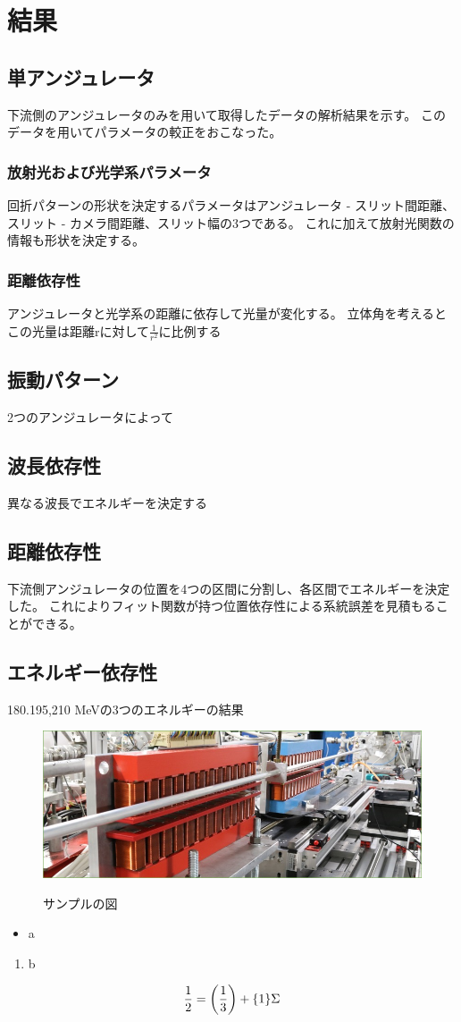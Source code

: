 \documentclass[a4paper,11pt,uplatex]{jsarticle}
\begin{document}
\section{結果}
\subsection{単アンジュレータ}
下流側のアンジュレータのみを用いて取得したデータの解析結果を示す。
このデータを用いてパラメータの較正をおこなった。
\subsubsection{放射光および光学系パラメータ}
回折パターンの形状を決定するパラメータはアンジュレータ - スリット間距離、スリット - カメラ間距離、スリット幅の3つである。
これに加えて放射光関数の情報も形状を決定する。
\subsubsection{距離依存性}
アンジュレータと光学系の距離に依存して光量が変化する。
立体角を考えるとこの光量は距離rに対して$\frac{1}{r^2}$に比例する
\subsection{振動パターン}
2つのアンジュレータによって
\subsection{波長依存性}
異なる波長でエネルギーを決定する
\subsection{距離依存性}
下流側アンジュレータの位置を4つの区間に分割し、各区間でエネルギーを決定した。
これによりフィット関数が持つ位置依存性による系統誤差を見積もることができる。
\subsection{エネルギー依存性}
180.195,210 MeVの3つのエネルギーの結果










\clearpage

\begin{figure}[tb]
  \centering
  \includegraphics[width=0.8\linewidth]{image/1-1.jpg}\\
  \caption{サンプルの図}
  \label{sample_image}
\end{figure}

\begin{itemize}
  \item a
\end{itemize}
\begin{enumerate}
  \item b
\end{enumerate}

\begin{align}
\frac{1}{2} = \qty(\frac{1}{3}) + \qty{1}\Sigma
\end{align}
\end{document}
